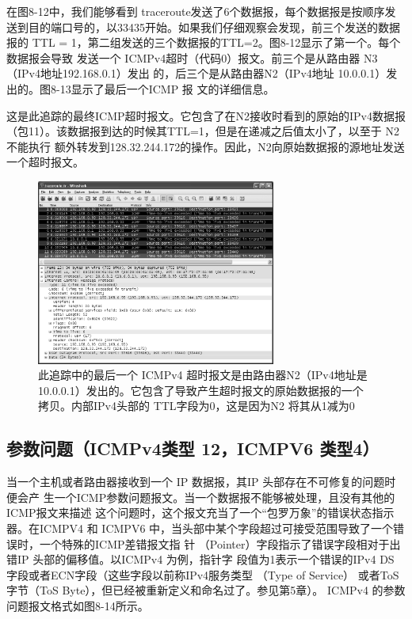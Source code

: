 在图8-12中，我们能够看到 traceroute发送了6个数据报，每个数据报是按顺序发
送到目的端口号的，以33435开始。如果我们仔细观察会发现，前三个发送的数据报的
TTL = 1，第二组发送的三个数据报的TTL=2。图8-12显示了第一个。每个数据报会导致
发送一个 ICMPv4超时（代码0）报文。前三个是从路由器 N3（IPv4地址192.168.0.1）发出
的，后三个是从路由器N2（IPv4地址 10.0.0.1）发出的。图8-13显示了最后一个ICMP 报
文的详细信息。

这是此追踪的最终ICMP超时报文。它包含了在N2接收时看到的原始的IPv4数据报
（包11）。该数据报到达的时候其TTL=1，但是在递减之后值太小了，以至于 N2 不能执行
额外转发到128.32.244.172的操作。因此，N2向原始数据报的源地址发送一个超时报文。
\begin{figure}[!htb]
	\centering
	\includegraphics[width=0.7\textwidth]{imgs/8/8-13.png}
	\caption{此追踪中的最后一个 ICMPv4 超时报文是由路由器N2（IPv4地址是10.0.0.1）发出的。它包含了导致产生超时报文的原始数据报的一个拷贝。内部IPv4头部的 TTL字段为0，这是因为N2 将其从1减为0}
\end{figure}

\subsection{参数问题（ICMPv4类型 12，ICMPV6 类型4）}

当一个主机或者路由器接收到一个 IP 数据报，其IP 头部存在不可修复的问题时便会产
生一个ICMP参数问题报文。当一个数据报不能够被处理，且没有其他的ICMP报文来描述
这个问题时，这个报文充当了一个“包罗万象”的错误状态指示器。在ICMPV4 和 ICMPV6
中，当头部中某个字段超过可接受范围导致了一个错误时，一个特殊的ICMP差错报文指
针 （Pointer）字段指示了错误字段相对于出错IP 头部的偏移值。以ICMPv4 为例，指针字
段值为1表示一个错误的IPv4 DS 字段或者ECN字段（这些字段以前称IPv4服务类型
（Type of Service） 或者ToS 字节（ToS Byte），但已经被重新定义和命名过了。参见第5章）。
ICMPv4 的参数问题报文格式如图8-14所示。

